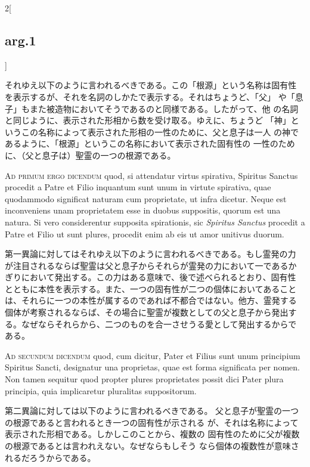 \documentclass[paper=a4paper,fontsize=10pt,jafontsize=9pt,titlepage]{jlreq}
\begin{document}
\begin{paracol}{2}[\subsection{arg.1}]
\switchcolumn

それゆえ以下のように言われるべきである。この「根源」という名称は固有性
を表示するが、それを名詞のしかたで表示する。それはちょうど、「父」
や「息子」もまた被造物においてそうであるのと同様である。したがって、他
の名詞と同じように、表示された形相から数を受け取る。ゆえに、ちょうど
「神」というこの名称によって表示された形相の一性のために、父と息子は一人
の神であるように、「根源」というこの名称において表示された固有性の
一性のために、（父と息子は）聖霊の一つの根源である。

\switchcolumn*[\subsection{ad.1}]

{\scshape Ad primum ergo dicendum} quod, si attendatur virtus spirativa,
Spiritus Sanctus procedit a Patre et Filio inquantum sunt
unum in virtute spirativa, quae quodammodo significat naturam cum
proprietate, ut infra dicetur. Neque est inconveniens unam
proprietatem esse in duobus suppositis, quorum est una natura. Si vero
considerentur supposita spirationis, sic {\itshape  Spiritus Sanctus}
procedit a Patre et Filio ut sunt plures, procedit enim ab eis ut amor
unitivus duorum.

\switchcolumn

第一異論に対してはそれゆえ以下のように言われるべきである。もし霊発の力
が注目されるならば聖霊は父と息子からそれらが霊発の力において一であるか
ぎりにおいて発出する。この力はある意味で、後で述べられるとおり、固有性
とともに本性を表示する。また、一つの固有性が二つの個体においてあること
は、それらに一つの本性が属するのであれば不都合ではない。他方、霊発する
個体が考察されるならば、その場合に聖霊が複数としての父と息子から発出す
る。なぜならそれらから、二つのものを合一させうる愛として発出するからで
ある。

\switchcolumn*[\subsection{ad.2}]

{\scshape Ad secundum dicendum} quod, cum dicitur, Pater et Filius sunt unum
principium  Spiritus Sancti, designatur una proprietas, quae est forma
significata per nomen. Non tamen sequitur quod propter plures
proprietates possit dici Pater plura principia, quia implicaretur
pluralitas suppositorum.

\switchcolumn

第二異論に対しては以下のように言われるべきである。
父と息子が聖霊の一つの根源であると言われるとき一つの固有性が示される
が、それは名称によって表示された形相である。しかしこのことから、複数の
 固有性のために父が複数の根源であるとは言われえない。なぜならもしそう
 なら個体の複数性が意味されるだろうからである。


\end{paracol}
\end{document}
